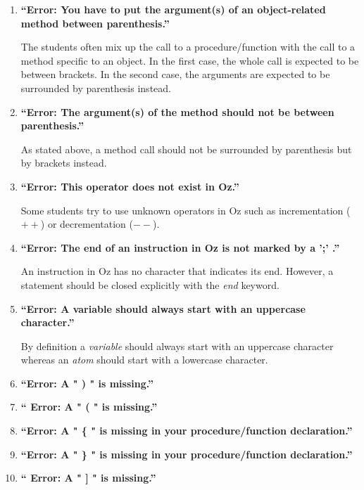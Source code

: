 \documentclass[11pt,a4paper,twoside,openright]{report}
\begin{document}
\begin{enumerate}

\item \textbf{\enquote{Error: You have to put the argument(s) of an object-related 
method between parenthesis.}}

The students often mix up the call to a procedure/function with the call to 
a method specific to an object. In the first case, the whole call is expected to 
be between brackets. In the second case, the arguments are expected to be 
surrounded by parenthesis instead.


\item \textbf{\enquote{Error: The argument(s) of the method should not be 
between parenthesis.}}

As stated above, a method call should not be surrounded by parenthesis but by 
brackets instead.

\item \textbf{\enquote{Error: This operator does not exist in Oz.}}

Some students try to use unknown operators in Oz such as incrementation ($++$) 
or decrementation ($--$).


\item \textbf{\enquote{Error: The end of an instruction in Oz is not marked by a ';' .}}

An instruction in Oz has no character that indicates its end. However, a statement should be closed 
explicitly with the \textit{end} keyword.

\item \textbf{\enquote{Error: A variable should always start with an uppercase 
character.}}

By definition a \textit{variable} should always start with an uppercase 
character whereas an \textit{atom} should start with a lowercase character.


\item \textbf{\enquote{Error: A " ) " is missing.}}

\item \textbf{\enquote{ Error: A " ( " is missing.}}

\item \textbf{\enquote{Error: A " \{ " is missing in your procedure/function 
declaration.}}

\item \textbf{\enquote{Error: A " \} " is missing in your procedure/function 
declaration.}}

\item \textbf{\enquote{ Error: A " ] " is missing.}}


\end{enumerate}
\end{document}

